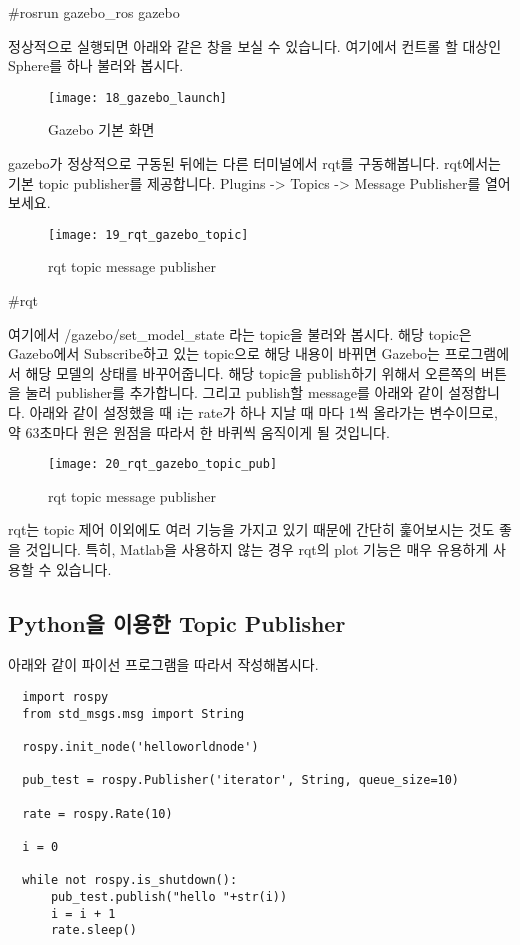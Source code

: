 \documentclass[11pt,fleqn]{book} %
\begin{document}
\#rosrun gazebo\_ros gazebo

정상적으로 실행되면 아래와 같은 창을 보실 수 있습니다. 여기에서 컨트롤 할 대상인 Sphere를 하나 불러와 봅시다.

\begin{figure}[h]
\centering\texttt{[image: 18\_gazebo\_launch]}
\caption{Gazebo 기본 화면}
\end{figure}

gazebo가 정상적으로 구동된 뒤에는 다른 터미널에서 rqt를 구동해봅니다.
rqt에서는 기본 topic publisher를 제공합니다. Plugins -> Topics -> Message Publisher를 열어보세요.

\begin{figure}[h]
\centering\texttt{[image: 19\_rqt\_gazebo\_topic]}
\caption{rqt topic message publisher}
\end{figure}

\#rqt

여기에서 /gazebo/set\_model\_state 라는 topic을 불러와 봅시다. 해당 topic은 Gazebo에서 Subscribe하고 있는 topic으로 해당 내용이 바뀌면
Gazebo는 프로그램에서 해당 모델의 상태를 바꾸어줍니다. 해당 topic을 publish하기 위해서 오른쪽의 \+ 버튼을 눌러 publisher를 추가합니다.
그리고 publish할 message를 아래와 같이 설정합니다. 아래와 같이 설정했을 때 i는 rate가 하나 지날 때 마다 1씩 올라가는 변수이므로, 약 63초마다 원은 원점을 따라서 한 바퀴씩 움직이게 될 것입니다.

\begin{figure}[h]
\centering\texttt{[image: 20\_rqt\_gazebo\_topic\_pub]}
\caption{rqt topic message publisher}
\end{figure}

rqt는 topic 제어 이외에도 여러 기능을 가지고 있기 때문에 간단히 훑어보시는 것도 좋을 것입니다.
특히, Matlab을 사용하지 않는 경우 rqt의 plot 기능은 매우 유용하게 사용할 수 있습니다.

\subsection{Python을 이용한 Topic Publisher}

아래와 같이 파이선 프로그램을 따라서 작성해봅시다.

\begin{verbatim}
  import rospy
  from std_msgs.msg import String

  rospy.init_node('helloworldnode')

  pub_test = rospy.Publisher('iterator', String, queue_size=10)

  rate = rospy.Rate(10)

  i = 0

  while not rospy.is_shutdown():
      pub_test.publish("hello "+str(i))
      i = i + 1
      rate.sleep()

\end{verbatim}
\end{document}
